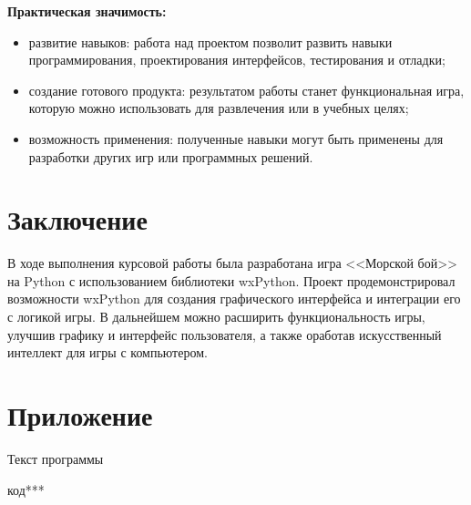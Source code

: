 \documentclass[14pt, oneside]{altsu-report}
\begin{document}
\textbf{Практическая значимость:}
\begin{itemize}
\item развитие навыков: работа над проектом позволит развить навыки программирования, проектирования интерфейсов, тестирования и отладки;
\item создание готового продукта: результатом работы станет функциональная игра, которую можно использовать для развлечения или в учебных целях;
\item возможность применения: полученные навыки могут быть применены для разработки других игр или программных решений.
\end{itemize}




\chapter*{Заключение}
В ходе выполнения курсовой работы была разработана игра <<Морской бой>> на Python с использованием библиотеки wxPython. Проект продемонстрировал возможности wxPython для создания графического интерфейса и интеграции его с логикой игры. В дальнейшем можно расширить функциональность игры, улучшив графику и интерфейс пользователя, а также оработав искусственный интеллект для игры с компьютером.

\newpage
{}
\printbibliography[title={Список использованной литературы}]
\nocite{*}

\appendix
\newpage
\chapter*{\raggedleft\label{appendix1}Приложение}

\begin{center}
\label{code:appendix}Текст программы
\end{center}
\begin{code}
код***
\end{code}
\end{document}
